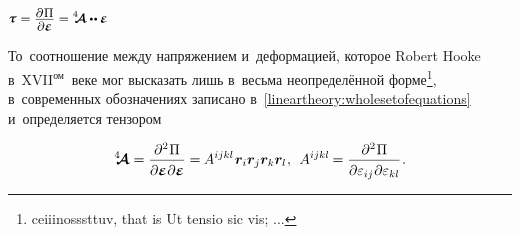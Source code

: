 \label{para:hookelaw}

\begin{otherlanguage}{russian}

\nopagebreak\vspace{-2.5em} ${\small \mathboldtau \hspace{0.1ex} = \displaystyle \frac{\raisemath{-0.2em}{\partial\hspace{0.1ex} \Pi}}{\raisemath{0.04em}{\partial \mathboldepsilon}} = \stiffnesstensor \dotdotp \mathboldepsilon}$ \nopagebreak\vspace{.55em}

\nopagebreak
То~соотношение между напряжением и~деформацией, которое Robert Hooke в~\hbox{XVII$^{\textrm{ом}}$\hspace{-0.12em}}~веке мог высказать лишь в~весьма неопределённой форме\footnote{ceiiinosssttuv, that is Ut tensio sic vis; ...}\hspace{-0.32em},\hspace{0.24em} в~современных обозначениях записано в~\eqref{lineartheory:wholesetofequations} и~определяется тензором

\nopagebreak\vspace{-0.1em}\begin{equation}
\stiffnesstensor =
\displaystyle \frac{\partial^2 \hspace{0.1ex} \Pi}{\raisemath{-0.1em}{\partial \mathboldepsilon \hspace{0.1ex} \partial \mathboldepsilon}} = \hspace{-0.1ex}
A^{ijkl} \hspace{.16ex} \bm{r}_i \bm{r}_j \bm{r}_k \bm{r}_l \hspace{0.1ex}, \:\:
%
A^{ijkl} \hspace{-0.16ex} =
\displaystyle \frac{\partial^2 \hspace{0.1ex} \Pi}{\raisemath{-0.1em}{\partial \varepsilon_{ij} \hspace{0.1ex} \partial \varepsilon_{kl}}} \hspace{0.16ex}.
\end{equation}


\end{otherlanguage}
